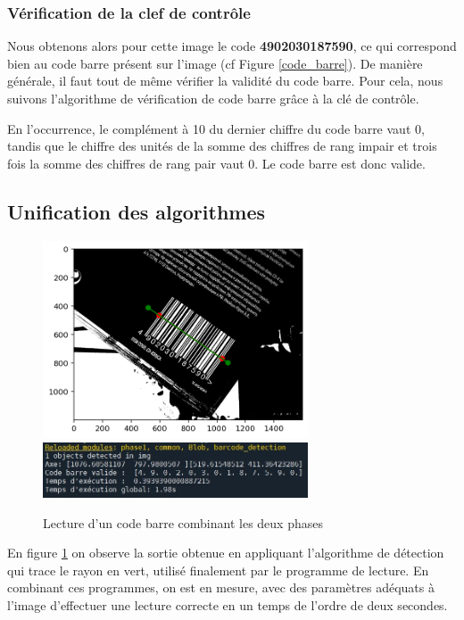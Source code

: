 \documentclass{rapport}
\begin{document}
\subsubsection*{Vérification de la clef de contrôle}
Nous obtenons alors pour cette image le code \textbf{4902030187590}, ce qui correspond bien au code barre présent sur l'image (cf Figure \ref{code_barre}).
De manière générale, il faut tout de même vérifier la validité du code barre. Pour cela, nous suivons l'algorithme de vérification de code barre grâce à la clé de contrôle.

En l'occurrence, le complément à 10 du dernier chiffre du code barre vaut 0, tandis que le chiffre des unités de la somme des chiffres de rang impair et trois fois la somme des chiffres de rang pair vaut 0. 
Le code barre est donc valide.

\subsection{Unification des algorithmes}

\begin{figure}[H] 
	\begin{center}
    \includegraphics[width=0.7\textwidth]{images/Detection/lecture2.png}
	\includegraphics[width=0.7\textwidth]{images/Detection/lecture.jpg}
	\caption{Lecture d'un code barre combinant les deux phases}
	\label{fig:finalres}
    	\end{center}
\end{figure}
En figure \ref{fig:finalres} on observe la sortie obtenue en appliquant l'algorithme de détection qui trace le rayon en vert, utilisé finalement par le programme de lecture.
\newline En combinant ces programmes, on est en mesure, avec des paramètres adéquats à l'image d'effectuer une lecture correcte en un temps de l'ordre de deux secondes.
\newpage 
\end{document}
